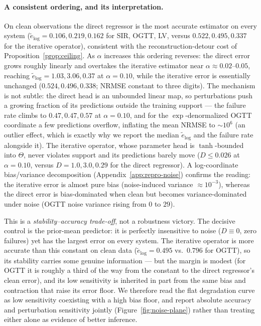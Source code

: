 \paragraph{A consistent ordering, and its interpretation.} On clean observations the direct regressor is
the most accurate estimator on every system ($\tilde e_{\log}=0.106,0.219,0.162$ for SIR, OGTT, LV, versus
$0.522,0.495,0.337$ for the iterative operator), consistent with the reconstruction-detour cost of
Proposition~\ref{prop:ceiling}. As $\alpha$ increases this ordering reverses: the direct error grows
roughly linearly and overtakes the iterative estimator near $\alpha\approx0.02$--$0.05$, reaching
$\tilde e_{\log}=1.03,3.06,0.37$ at $\alpha=0.10$, while the iterative error is essentially unchanged
($0.524,0.496,0.338$; NRMSE constant to three digits). The mechanism is not subtle: the direct head is an
unbounded linear map, so perturbations push a growing fraction of its predictions outside the training
support --- the failure rate climbs to $0.47,0.47,0.57$ at $\alpha=0.10$, and for the $\exp$-denormalized
OGTT coordinate a few predictions overflow, inflating the mean NRMSE to $\sim\!10^{6}$ (an outlier effect,
which is exactly why we report the median $\tilde e_{\log}$ and the failure rate alongside it). The
iterative operator, whose parameter head is $\tanh$-bounded into $\Theta$, never violates support and its
predictions barely move ($D\le0.026$ at $\alpha=0.10$, versus $D=1.0,3.0,0.29$ for the direct regressor).
A log-coordinate bias/variance decomposition (Appendix~\ref{app:repro-noise}) confirms the reading: the
iterative error is almost pure bias (noise-induced variance $\approx10^{-3}$), whereas the direct error is
bias-dominated when clean but becomes variance-dominated under noise (OGTT noise variance rising from $0$
to $29$).

This is a \emph{stability--accuracy trade-off}, not a robustness victory. The decisive control is the
prior-mean predictor: it is perfectly insensitive to noise ($D\equiv0$, zero failures) yet has the largest
error on every system. The iterative operator is more accurate than this constant on clean data
($\tilde e_{\log}=0.495$ vs.\ $0.796$ for OGTT), so its stability carries some genuine information --- but
the margin is modest (for OGTT it is roughly a third of the way from the constant to the direct
regressor's clean error), and its low sensitivity is inherited in part from the same bias and contraction
that raise its error floor. We therefore read the flat degradation curve as low sensitivity coexisting with
a high bias floor, and report absolute accuracy and perturbation sensitivity jointly
(Figure~\ref{fig:noise-plane}) rather than treating either alone as evidence of better inference.

